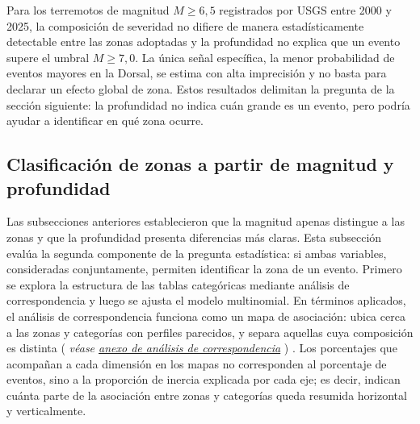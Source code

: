 \documentclass[
  spanish,
  letterpaper,
  DIV=11,
  numbers=noendperiod]{scrartcl}
\newcommand{\asesoriaParenRef}[1]{%
  \textnormal{\textcolor{asesoriaTextColor}{(}}%
  {\hypersetup{linkcolor=asesoriaLinkColor,urlcolor=asesoriaLinkColor,citecolor=asesoriaLinkColor}\textcolor{asesoriaTextColor}{\emph{#1}}}%
  \textnormal{\textcolor{asesoriaTextColor}{)}}%
}
\begin{document}
Para los terremotos de magnitud \(M \geq 6{,}5\) registrados por USGS
entre 2000 y 2025, la composición de severidad no difiere de manera
estadísticamente detectable entre las zonas adoptadas y la profundidad
no explica que un evento supere el umbral \(M \geq 7{,}0\). La única
señal específica, la menor probabilidad de eventos mayores en la Dorsal,
se estima con alta imprecisión y no basta para declarar un efecto global
de zona. Estos resultados delimitan la pregunta de la sección siguiente:
la profundidad no indica cuán grande es un evento, pero podría ayudar a
identificar en qué zona ocurre.

\subsection{Clasificación de zonas a partir de magnitud y
profundidad}\label{sec-res-clasificacion}

Las subsecciones anteriores establecieron que la magnitud apenas
distingue a las zonas y que la profundidad presenta diferencias más
claras. Esta subsección evalúa la segunda componente de la pregunta
estadística: si ambas variables, consideradas conjuntamente, permiten
identificar la zona de un evento. Primero se explora la estructura de
las tablas categóricas mediante análisis de correspondencia y luego se
ajusta el modelo multinomial. En términos aplicados, el análisis de
correspondencia funciona como un mapa de asociación: ubica cerca a las
zonas y categorías con perfiles parecidos, y separa aquellas cuya
composición es distinta
\asesoriaParenRef{véase \hyperref[sec-anexo-correspondencia]{anexo de análisis de correspondencia}}.
Los porcentajes que acompañan a cada dimensión en los mapas no
corresponden al porcentaje de eventos, sino a la proporción de inercia
explicada por cada eje; es decir, indican cuánta parte de la asociación
entre zonas y categorías queda resumida horizontal y verticalmente.
\end{document}
